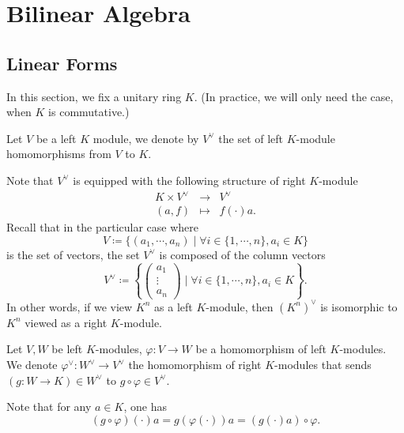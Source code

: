 \chapter{Bilinear Algebra}
\section{Linear Forms}\label{2.1}
\quad In this section, we fix a unitary ring $K$. (In practice, we will only need the case, when $K$ is commutative.)

\begin{definitionenv}\label{2.1.1}
    Let $V$ be a left $K$ module, we denote by $V^\vee $ the set of left $K$-module homomorphisms from $V$ to $K$.

    \quad Note that $V^\vee$ is equipped with the following structure of right $K$-module
    $$ \begin{array}{rcl}
        K \times V^\vee & \rightarrow & V^\vee\\
        (a,f) & \mapsto & f(\cdot) a.
    \end{array}$$
    Recall that in the particular case where 
    $$
    V\coloneq \{(a_1, \cdots, a_n)\mid \forall i\in \{1,\cdots,n\},a_i\in K\}
    $$
    is the set of vectors, the set $V^\vee$ is composed of the column vectors
    $$
    V^\vee \coloneq \left\{ 
        \begin{pmatrix}
        a_1\\
        \vdots\\
        a_n
        \end{pmatrix}\mid \forall i\in \{1,\cdots , n\}, a_i\in K \right\}.
    $$
    In other words, if we view $K^n$ as a left $K$-module, then $(K^n)^{\vee}$ is isomorphic to $K^n$ viewed as a right $K$-module.
\end{definitionenv}
\begin{definitionenv}
    Let $V,W$ be left $K$-modules, $\varphi: V\rightarrow W$ be a homomorphism of left $K$-modules. We denote $\varphi^\vee : W^\vee \rightarrow V^\vee$ the homomorphism of right $K$-modules that sends $(g:W\rightarrow K) \in W^\vee$ to $g\circ \varphi \in V^\vee$.
    \begin{center}
    \end{center}
    Note that for any $a\in K$, one has
    $$
    \left(g\circ \varphi\right)\left(\cdot\right) a = g\left(\varphi\left(\cdot\right)\right) a = \left(g\left(\cdot\right)a \right) \circ \varphi.
    $$
\end{definitionenv}
